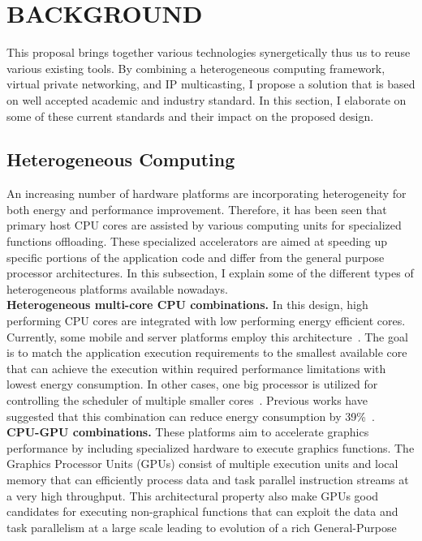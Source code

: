 \chapter{BACKGROUND}
\label{chap:background}
This proposal brings together various technologies synergetically thus
us to reuse various existing tools.
%
By combining a heterogeneous computing framework, virtual private
networking, and IP multicasting, I propose a solution that is based on
well accepted academic and industry standard.
%
In this section, I elaborate on some of these current standards and
their impact on the proposed design.
%
\section{Heterogeneous Computing}
\label{back:heterogeneous}
An increasing number of hardware platforms are incorporating
heterogeneity for both energy and performance improvement.
%
Therefore,  it has been seen that primary host CPU cores are assisted by
various computing units for specialized functions offloading.
%
These specialized accelerators are aimed at speeding up specific
portions of the application code and differ from the general purpose
processor architectures.
%
In this subsection, I explain some of the different types of
heterogeneous platforms available nowadays.\\
%
{\bf Heterogeneous multi-core CPU combinations.}
In this design, high performing CPU cores are integrated with low
performing energy efficient cores.
%
Currently, some mobile and server platforms employ this
architecture~\cite{atom}.
%
The goal is to match the application execution requirements to the
smallest available core that can achieve the execution within required
performance limitations with lowest energy consumption.
%
In other cases, one big processor is utilized for controlling the
scheduler of multiple smaller cores~\cite{nvidia}.
%
Previous works have suggested that this combination can reduce energy
consumption by 39\%~\cite{kumar}.\\
%
{\bf CPU-GPU combinations.}
These platforms aim to accelerate graphics performance by including
specialized hardware to execute graphics functions.
%
The Graphics Processor Units (GPUs) consist of multiple execution units
and local memory that can efficiently process data and task parallel
instruction streams at a very high throughput.
%
This architectural property also make GPUs good candidates for executing
non-graphical functions that can exploit the data and task parallelism
at a large scale leading to evolution of a rich General-Purpose
